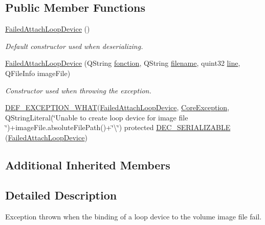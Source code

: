 \subsection*{Public Member Functions}
\begin{DoxyCompactItemize}
\item 
\hyperlink{class_gost_crypt_1_1_core_1_1_failed_attach_loop_device_acfa2d771e47776f6c75edbc67ddb9196}{Failed\+Attach\+Loop\+Device} ()
\begin{DoxyCompactList}\small\item\em Default constructor used when deserializing. \end{DoxyCompactList}\item 
\hyperlink{class_gost_crypt_1_1_core_1_1_failed_attach_loop_device_a71a1fe1bcf5934af28a3556edf4e0350}{Failed\+Attach\+Loop\+Device} (Q\+String \hyperlink{class_gost_crypt_1_1_gost_crypt_exception_a29b8c93d5efbb1ff369107385725a939}{fonction}, Q\+String \hyperlink{class_gost_crypt_1_1_gost_crypt_exception_a749a12375f4ba9d502623b99d8252f38}{filename}, quint32 \hyperlink{class_gost_crypt_1_1_gost_crypt_exception_abf506d911f12a4e969eea500f90bd32c}{line}, Q\+File\+Info image\+File)
\begin{DoxyCompactList}\small\item\em Constructor used when throwing the exception. \end{DoxyCompactList}\item 
\hyperlink{_gost_crypt_exception_8h_a5bc1e1c6c9d6f46c84eeba49e33355f9}{D\+E\+F\+\_\+\+E\+X\+C\+E\+P\+T\+I\+O\+N\+\_\+\+W\+H\+AT}(\hyperlink{class_gost_crypt_1_1_core_1_1_failed_attach_loop_device}{Failed\+Attach\+Loop\+Device}, \hyperlink{class_gost_crypt_1_1_core_1_1_core_exception}{Core\+Exception}, Q\+String\+Literal(\char`\"{}Unable to create loop device for image file \char`\"{})+image\+File.\+absolute\+File\+Path()+\char`\"{}\textbackslash{}\char`\"{}) protected \hyperlink{class_gost_crypt_1_1_core_1_1_failed_attach_loop_device_ad391dc265dccb8a875cc6bd2f4521b82}{D\+E\+C\+\_\+\+S\+E\+R\+I\+A\+L\+I\+Z\+A\+B\+LE} (\hyperlink{class_gost_crypt_1_1_core_1_1_failed_attach_loop_device}{Failed\+Attach\+Loop\+Device})
\end{DoxyCompactItemize}
\subsection*{Additional Inherited Members}


\subsection{Detailed Description}
Exception thrown when the binding of a loop device to the volume image file fail. 

